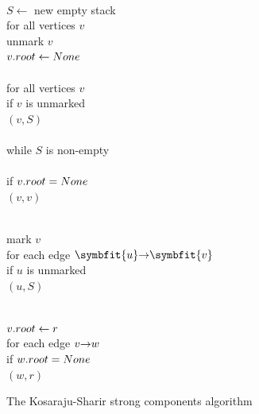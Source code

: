 \begin{figure}[ht]
\centering
\begin{minipage}[c]{0.45\linewidth}
\begin{pseudocode}
\\
$S \gets$ new empty stack\\
for all vertices $v$\\
\Indent unmark $v$\\
\Indent $v.root \gets None$\\
\\
for all vertices $v$\\
\Indent if $v$ is unmarked\\
\Indent\Indent {}$(v, S)$\\
\\
while $S$ is non-empty\\
\\
\Indent if $v.root = None$\\
\Indent\Indent {}$(v, v)$
\end{pseudocode}
\end{minipage}\hfill
\begin{minipage}[c]{0.51\linewidth}
\begin{pseudocode}
\\
mark $v$\\
for each edge {\color{JEblue}\bfseries $\arc{\symbfit{u}}{\symbfit{v}}$} \\
\Indent if $u$ is unmarked\\
\Indent\Indent {}$(u, S)$\\
\end{pseudocode}
\begin{pseudocode}
\\
$v.root \gets r$\\
for each edge $v\mathord{\rightarrow}w$\\
\Indent if $w.root = None$\\
\Indent\Indent {}$(w, r)$
\end{pseudocode}
\end{minipage}
\caption{The Kosaraju-Sharir strong components algorithm}
\label{fig:6.16}
\end{figure}

